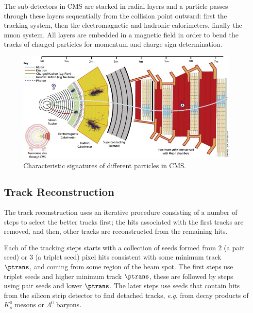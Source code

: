 The sub-detectors in CMS are stacked in radial layers and a particle passes through these layers sequentially from the collision point outward: first the tracking system, then the electromagnetic and hadronic calorimeters, finally the muon system. All layers are embedded in a magnetic field in order to bend the tracks of charged particles for momentum and charge sign determination.

\begin{figure}[htb!!!]
\centering
\includegraphics[scale=1.15, angle=90]{figures/experiment/CMSPId.jpg} 
\caption[Characteristic signatures of different particles in CMS]{Characteristic signatures of different particles in CMS.}
\label{PId}
\end{figure}

\subsection{Track Reconstruction}
The track reconstruction uses an iterative procedure \cite{Khachatryan:2010pw} consisting of a number of steps to select the better tracks first; the hits associated with the first tracks are removed, and then, other tracks are reconstructed from the remaining hits. 

Each of the tracking steps starts with a collection of seeds formed from 2 (a pair seed) or 3 (a triplet seed) pixel hits consistent with some minimum track $\ptrans$, and coming from some region of the beam spot. The first steps use triplet seeds and higher minimum track $\ptrans$, these are followed by steps using pair seeds and lower $\ptrans$. The later steps use seeds that contain hits from the silicon strip detector to find detached tracks, \textit{e.g.} from decay products of $K^0_s$ mesons or $\Lambda^0$ baryons. 

